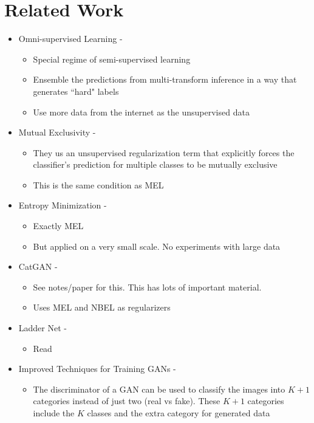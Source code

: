 \section{Related Work}
\label{sec:related}

\begin{itemize}
	\item Omni-supervised Learning - \cite{Radosavovic2017}
	\begin{itemize}
		\item Special regime of semi-supervised learning
		\item Ensemble the predictions from multi-transform inference in  a way that generates ``hard"
			labels
		\item Use more data from the internet as the unsupervised data
	\end{itemize}

	\item Mutual Exclusivity - \cite{Sajjadi2016}
	\begin{itemize}
		\item They us an unsupervised regularization term that explicitly forces the classifier's
			prediction for multiple classes to be mutually exclusive 
		\item This is the same condition as MEL 
	\end{itemize}
	
	\item Entropy Minimization - \cite{Grandvalet2005}
	\begin{itemize}
		\item Exactly MEL
		\item But applied on a very small scale. No experiments with large data
	\end{itemize}
	
	\item CatGAN - \cite{Springenberg2015}
	\begin{itemize}
		\item See notes/paper for this. This has lots of important material.  
		\item Uses MEL and NBEL as regularizers
	\end{itemize}
	
	\item Ladder Net - \cite{Rasmus2015}
	\begin{itemize}
		\item Read
	\end{itemize}
	
	\item Improved Techniques for Training GANs - \cite{Salimans2016}
	\begin{itemize}
		\item The discriminator of a GAN can be used to classify the images into $K+1$ categories
			instead of just two (real vs fake). These $K+1$ categories include the $K$ classes and the
			extra category for generated data
	\end{itemize}
	

\end{itemize}
